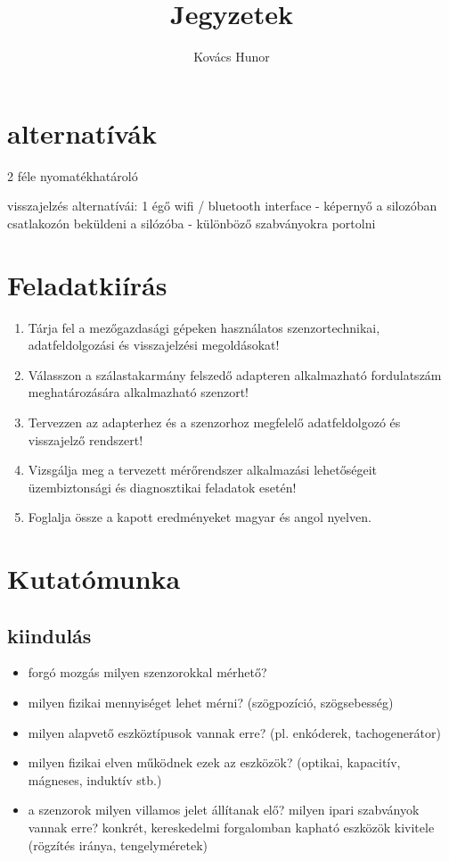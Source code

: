 \documentclass{article}
\title{Jegyzetek}
\author{Kovács Hunor}
\begin{document}
	\maketitle
	
	\section{alternatívák}
	
	2 féle nyomatékhatároló
	
	visszajelzés alternatívái:
	1 égő
	wifi / bluetooth interface - képernyő a silozóban
	csatlakozón beküldeni a silózóba - különböző szabványokra portolni
	
	\section{Feladatkiírás}
	
	\begin{enumerate}
		
		\item Tárja fel a mezőgazdasági gépeken használatos szenzortechnikai, adatfeldolgozási és visszajelzési megoldásokat!
		\item Válasszon a szálastakarmány felszedő adapteren alkalmazható fordulatszám meghatározására alkalmazható szenzort!
		\item Tervezzen az adapterhez és a szenzorhoz megfelelő adatfeldolgozó és visszajelző rendszert!
		\item Vizsgálja meg a tervezett mérőrendszer alkalmazási lehetőségeit üzembiztonsági és diagnosztikai feladatok esetén!
		\item Foglalja össze a kapott eredményeket magyar és angol nyelven.
	\end{enumerate}
	
	\section{Kutatómunka}
	\subsection{kiindulás}
	\begin{itemize}
		\item forgó mozgás milyen szenzorokkal mérhető?
		\item milyen fizikai mennyiséget lehet mérni? (szögpozíció, szögsebesség)
		\item milyen alapvető eszköztípusok vannak erre? (pl. enkóderek, tachogenerátor)
		\item milyen fizikai elven működnek ezek az eszközök? (optikai, kapacitív, mágneses, induktív stb.)
		\item a szenzorok milyen villamos jelet állítanak elő? milyen ipari szabványok vannak erre?
		konkrét, kereskedelmi forgalomban kapható eszközök kivitele (rögzítés iránya, tengelyméretek)
	\end{itemize}
	
\end{document}
